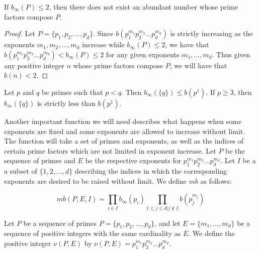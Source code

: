 \documentclass[../paper.tex]{article}
\begin{document}
\begin{theorem} \label{b_inf_n!}
If $b_{\infty}(P) \leq 2$, then there does not exist an abundant
number whose prime factors compose $P$.
\end{theorem}

\begin{proof}
Let $P = \{p_1, p_2, ..., p_d\}$.
Since $b(p_1^{m_1} p_2^{m_2} ... p_d^{m_d})$ is strictly increasing as the
exponents $m_1, m_2, ..., m_d$ increase while $b_{\infty}(P) \leq
2$, we have that $b(p_1^{m_1} p_2^{m_2} ... p_d^{m_d}) < 
b_{\infty}(P) \leq 2$ for any given exponents $m_1, ..., m_d$. 
Thus given any positive integer $n$ whose prime factors compose
$P$, we will have that $b(n) < 2$.
\end{proof}

\begin{theorem} \label{prime_ineq}
Let $p$ and $q$ be primes such that $p < q$. Then $b_\infty(\{q\})
\leq b(p^1)$. If $p \geq 3$, then $b_{\infty}(\{q\})$ is strictly
less than $b(p^1)$.
\end{theorem}

Another important function we will need describes what happens 
when some exponents are fixed and some exponents are allowed to
increase without limit. 
The function will take a set of primes and exponents,
as well as the indices of certain prime factors which are not
limited in exponent increase. Let $P$ be the sequence of primes 
and $E$ be the respective exponents for 
$p_1^{m_1} p_2^{m_2} ... p_d^{m_d}$. Let $I$ be a a subset of
$\{1, 2, ..., d\}$ describing the indices in which the corresponding
exponents are desired to be raised without limit. We define $mb$ as 
follows:

\begin{equation}\label{mb_def}
  mb(P,E,I) = \prod_{i \in I} b_{\infty}(p_i) 
  \prod_{1 \leq j \leq d | j \notin I} b(p_j^{m_j})
\end{equation}


Let $P$ be a sequence of primes $P = \{p_1, p_2, ..., p_d\}$,
and let $E = \{m_1, ..., m_d\}$ be a sequence of positive integers
with the same cardinality as $E$. We define the positive integer 
$\nu(P,E)$ by $\nu(P,E) = p_1^{m_1} p_2^{m_2} ... p_d^{m_d}$. 
\end{document}
